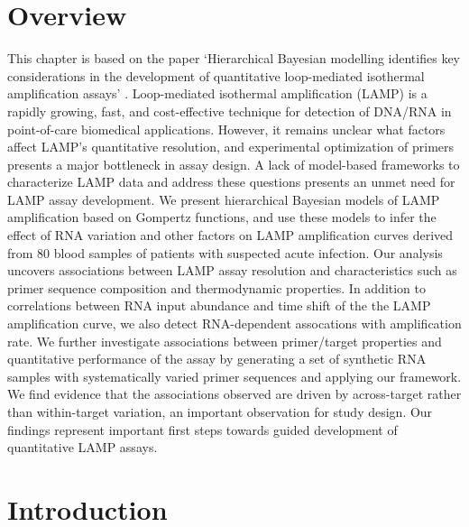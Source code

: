 \documentclass[../thesis.tex]{subfiles}
\begin{document}
\section{Overview}
This chapter is based on the paper `Hierarchical Bayesian modelling identifies key considerations in the development of quantitative loop-mediated isothermal amplification assays' \citep{bradley_hierarchical_2023}. Loop-mediated isothermal amplification (LAMP) is a rapidly growing, fast, and cost-effective technique for detection of DNA/RNA in point-of-care biomedical applications. However, it remains unclear what factors affect LAMP's quantitative resolution, and experimental optimization of primers presents a major bottleneck in assay design. A lack of model-based frameworks to characterize LAMP data and address these questions presents an unmet need for LAMP assay development.
We present hierarchical Bayesian models of LAMP amplification based on Gompertz functions, and use these models to infer the effect of RNA variation and other factors on LAMP amplification curves derived from 80 blood samples of patients with suspected acute infection. Our analysis uncovers associations between LAMP assay resolution and characteristics such as primer sequence composition and thermodynamic properties. In addition to correlations between RNA input abundance and time shift of the the LAMP amplification curve, we also detect RNA-dependent assocations with amplification rate.  We further investigate associations between primer/target properties and quantitative performance of the assay by generating a set of synthetic RNA samples with systematically varied primer sequences and applying our framework. We find evidence that the associations observed are driven by across-target rather than within-target variation, an important observation for study design. Our findings represent important first steps towards guided development of quantitative LAMP assays.


\section{Introduction \label{sec:intro}}
\end{document}
